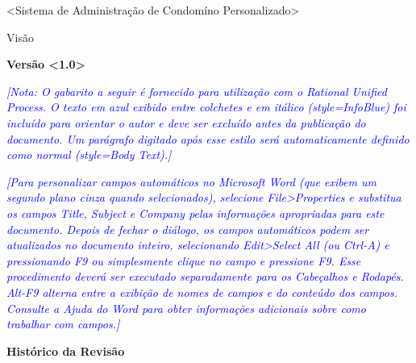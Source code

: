\documentclass[a4paper]{article}
\title{}
\author{}
\date{}
\begin{document}
\clearpage\setcounter{page}{1}\pagestyle{Standard}

\bigskip

{\raggedleft
{\textless}Sistema de Administração de Condomíno Personalizado{\textgreater}
\par}

{\raggedleft
Visão
\par}


\bigskip

{\raggedleft
\textbf{Vers\~ao {\textless}1.0{\textgreater}}
\par}


\bigskip


\bigskip

\textit{\textcolor{blue}{[Nota: O gabarito a seguir \'e fornecido para utiliza\c{c}\~ao com o Rational Unified Process.
O texto em azul exibido entre colchetes e em it\'alico (style=InfoBlue) foi inclu\'ido para orientar o autor e deve ser
exclu\'ido antes da publica\c{c}\~ao do documento. Um par\'agrafo digitado ap\'os esse estilo ser\'a automaticamente
definido como normal (style=Body Text).]}}

\textit{\textcolor{blue}{[Para personalizar campos autom\'aticos no Microsoft Word (que exibem um segundo plano cinza
quando selecionados), selecione File{\textgreater}Properties e substitua os campos Title, Subject e Company pelas
informa\c{c}\~oes apropriadas para este documento. Depois de fechar o di\'alogo, os campos autom\'aticos podem ser
atualizados no documento inteiro, selecionando Edit{\textgreater}Select All (ou Ctrl-A) e pressionando F9 ou
simplesmente clique no campo e pressione F9. Esse procedimento dever\'a ser executado separadamente para os
Cabe\c{c}alhos e Rodap\'es. Alt-F9 alterna entre a exibi\c{c}\~ao de nomes de campos e do conte\'udo dos campos.
Consulte a Ajuda do Word para obter informa\c{c}\~oes adicionais sobre como trabalhar com campos.]}}

{\centering
\textbf{Hist\'orico da Revis\~ao}
\par}
\end{document}
